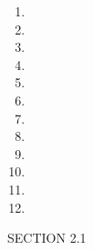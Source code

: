 \begin{enumerate}

\item 

\enumeratext{

}


\item 

\enumeratext{

}


\item 

\enumeratext{

}


\item 

\enumeratext{

}


\item 

\enumeratext{

}


\item 

\enumeratext{

}


\item 

\enumeratext{

}


\item 

\enumeratext{

}


\item 

\enumeratext{

}


\item 

\enumeratext{

}


\item 

\enumeratext{

}


\item 

\enumeratext{

}



\end{enumerate}

SECTION 2.1

